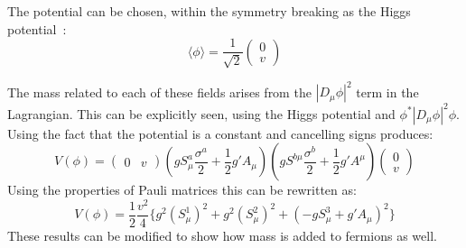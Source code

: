 The potential can be chosen, within the symmetry breaking as the Higgs potential~\cite{35Higgs}:
\begin{equation}
\langle \phi \rangle = \frac{1}{\sqrt{2}}
\begin{pmatrix}
    0\\
    v
\end{pmatrix}
\end{equation}

The mass related to each of these fields arises from the $|D_\mu \phi |^2$ term in the Lagrangian. This can be explicitly seen, using the Higgs potential and $\phi^* |D_\mu \phi |^2 \phi$. Using the fact that the potential is a constant and cancelling signs produces:
\begin{equation}
V(\phi) = \begin{pmatrix}
    0 & v
\end{pmatrix}
(
g S^a_\mu \frac{\sigma^a}{2} + \frac{1}{2}g' A_\mu
)
(
g S^{b\mu} \frac{\sigma^b}{2} + \frac{1}{2}g' A^\mu
)
\begin{pmatrix}
    0\\
    v
\end{pmatrix}
\end{equation}
Using the properties of Pauli matrices this can be rewritten as:
\begin{equation}
V(\phi) = \frac{1}{2}\frac{v^2}{4}\lbrace g^2 (S_\mu^1)^2 + g^2 (S_\mu^2)^2 + (-gS^3_\mu+g' A_\mu)^2 \rbrace
\end{equation}
These results can be modified to show how mass is added to fermions as well.

